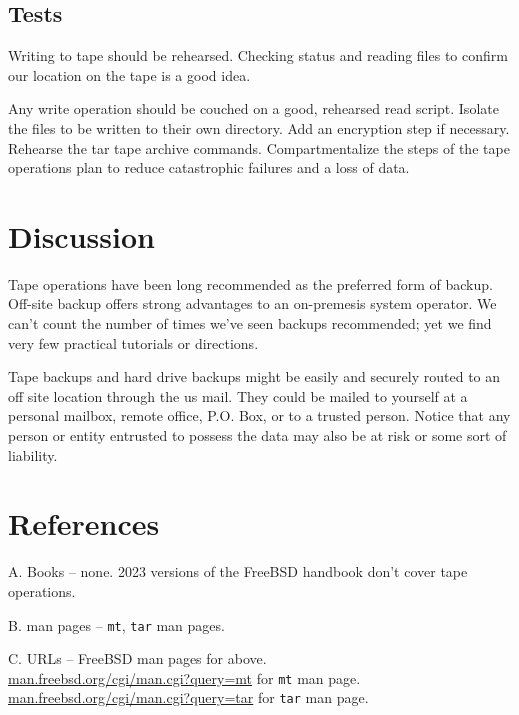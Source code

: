 \subsection{Tests}
Writing to tape should be rehearsed.  Checking status and reading files to confirm our location on the tape is a good idea.

Any write operation should be couched on a good, rehearsed read script.  Isolate the files to be written to their own directory.  Add an   \gls{encrypt}ion step if necessary.  Rehearse the tar tape archive commands.  Compartmentalize the steps of the tape operations plan to reduce catastrophic failures and a loss of data.



\section{Discussion}
Tape operations have been long recommended as the preferred form of \gls{backup}.  Off-site \gls{backup} offers strong advantages to an on-premesis system operator.  We can’t count the number of times we’ve seen backups recommended; yet we find very few practical tutorials or directions.

Tape backups and hard drive backups might be easily and securely routed to an off site location through the \gls{us} mail.  They could be mailed to yourself at a personal mailbox, remote office, P.O. Box, or to a trusted person.  Notice that any person or entity entrusted to possess the data may also be at risk or some sort of liability.



\section{References}
A.  Books – none.  2023 versions of the FreeBSD handbook don’t cover tape operations.

B.  man pages – \texttt{mt}, \texttt{tar} man pages.

C.  URLs – FreeBSD man pages for above. \\
\url{man.freebsd.org/cgi/man.cgi?query=mt} for \texttt{mt} man page.\\
\url{man.freebsd.org/cgi/man.cgi?query=tar} for \texttt{tar} man page.

\markchapterendnotes
